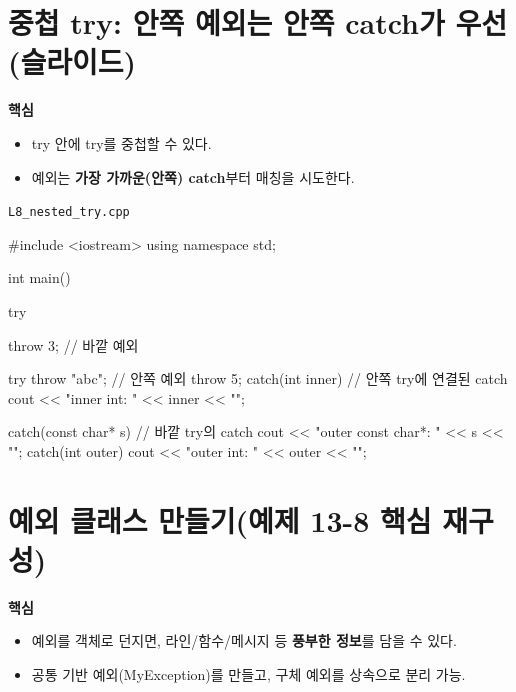 \documentclass[11pt,a4paper]{article}
\newcommand{\filetag}[1]{\texttt{\color{Accent}#1}}
\begin{document}
\section{중첩 try: 안쪽 예외는 안쪽 catch가 우선(슬라이드)}
\begin{GoalBox}
\textbf{핵심}
\begin{itemize}[leftmargin=18pt]
  \item try 안에 try를 중첩할 수 있다.
  \item 예외는 \textbf{가장 가까운(안쪽) catch}부터 매칭을 시도한다.
\end{itemize}
\end{GoalBox}

\noindent\filetag{L8\_nested\_try.cpp}
\begin{cppcode}
#include <iostream>
using namespace std;

int main() {
    try {
        throw 3; // 바깥 예외

        try {
            throw "abc"; // 안쪽 예외
            throw 5;
        }
        catch(int inner) { // 안쪽 try에 연결된 catch
            cout << "inner int: " << inner << "\n";
        }
    }
    catch(const char* s) { // 바깥 try의 catch
        cout << "outer const char*: " << s << "\n";
    }
    catch(int outer) {
        cout << "outer int: " << outer << "\n";
    }
}
\end{cppcode}

\section{예외 클래스 만들기(예제 13-8 핵심 재구성)}
\begin{GoalBox}
\textbf{핵심}
\begin{itemize}[leftmargin=18pt]
  \item 예외를 객체로 던지면, 라인/함수/메시지 등 \textbf{풍부한 정보}를 담을 수 있다.
  \item 공통 기반 예외(MyException)를 만들고, 구체 예외를 상속으로 분리 가능.
\end{itemize}
\end{GoalBox}
\end{document}
